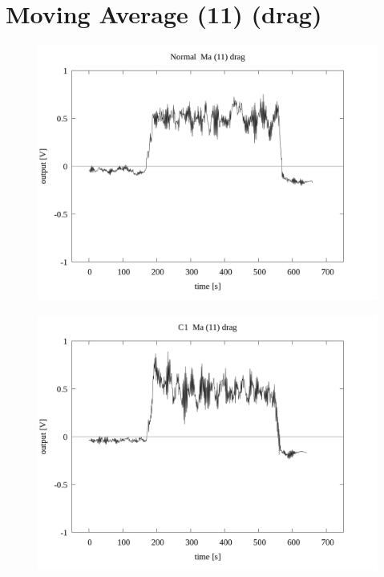 \documentclass[a4paper]{jsarticle}
\author{}
\title{}
\date{}
\begin{document}
\section{Moving Average (11) (drag)}

\begin{figure}[htbp]
    \footnotesize
    \begin{center}
        \includegraphics[width=140mm]{../../../33_result/210806/moving_average/11/drag/01/Normal_ma(11)_drag_01.png}
    \end{center}
\end{figure}

\begin{figure}[htbp]
    \footnotesize
    \begin{center}
        \includegraphics[width=140mm]{../../../33_result/210806/moving_average/11/drag/01/C1_ma(11)_drag_01.png}
    \end{center}
\end{figure}
\end{document}
